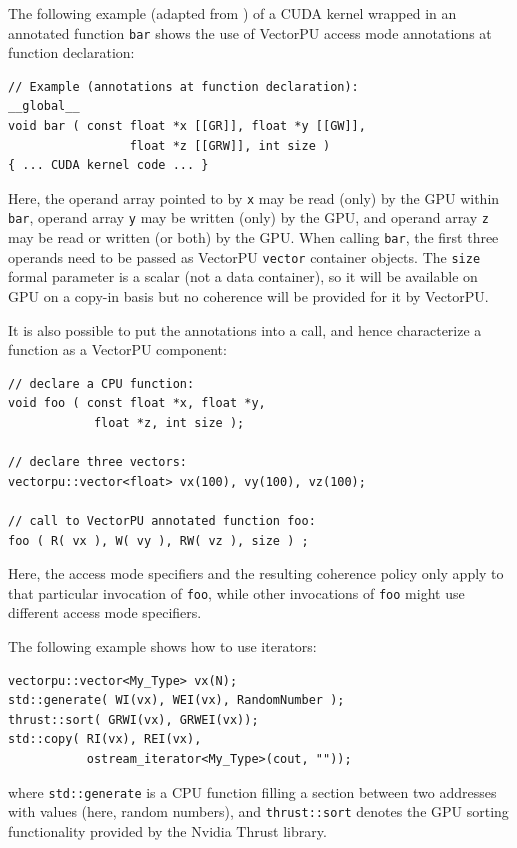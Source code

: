 The following example (adapted from \cite{VectorPU-2017}) 
of a CUDA kernel wrapped in an 
 annotated function \verb.bar. shows the use of 
VectorPU access mode annotations at function declaration:

{\footnotesize \begin{verbatim}
// Example (annotations at function declaration): 
__global__
void bar ( const float *x [[GR]], float *y [[GW]],
                 float *z [[GRW]], int size )
{ ... CUDA kernel code ... }
\end{verbatim}}

Here, the operand array pointed to by \verb.x. may be read (only) by the GPU within \verb.bar.,
operand array \verb.y. may be written (only) by the GPU, and 
operand array \verb.z. may be read or written (or both) by the GPU.
When calling \verb.bar., the
first three operands need to be passed as VectorPU \verb.vector. 
container objects.
The \verb.size. formal parameter is a scalar (not a data container), so it
will be available on GPU on a copy-in basis but no coherence will
be provided for it by VectorPU.

It is also possible to put the annotations into a call, and hence characterize a function as a VectorPU component:


{\footnotesize \begin{verbatim}
// declare a CPU function:
void foo ( const float *x, float *y,
            float *z, int size );

// declare three vectors:
vectorpu::vector<float> vx(100), vy(100), vz(100);

// call to VectorPU annotated function foo:
foo ( R( vx ), W( vy ), RW( vz ), size ) ;
\end{verbatim}}

Here, the access mode specifiers and the resulting coherence policy
 only apply to that particular invocation of \verb-foo-, while other
invocations of \verb-foo- might use different access mode specifiers.

The following example shows how to use iterators:

{\footnotesize \begin{verbatim}
vectorpu::vector<My_Type> vx(N);
std::generate( WI(vx), WEI(vx), RandomNumber );
thrust::sort( GRWI(vx), GRWEI(vx));
std::copy( RI(vx), REI(vx),
           ostream_iterator<My_Type>(cout, ""));
\end{verbatim}}

\noindent 
where \verb.std::generate. is a CPU function filling a section between
two addresses with values (here, random numbers),
and \verb.thrust::sort. denotes the GPU sorting functionality
provided by the Nvidia Thrust library. 

